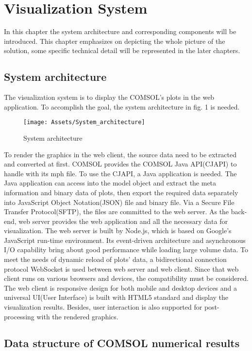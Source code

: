 \chapter{Visualization System}
In this chapter the system architecture and corresponding components will be introduced. This chapter emphasizes on depicting the whole picture of the solution, some specific technical detail will be represented in the later chapters.

\section{System architecture}

The visualization system is to display the COMSOL's plots in the web application. To accomplish the goal, the system architecture in fig. 1 is needed.

\begin{figure}[htb]
  \centering
  \texttt{[image: Assets/System\_architecture]}
  \caption{System architecture}
\end{figure}

To render the graphics in the web client, the source data need to be extracted and converted at first. COMSOL provides the COMSOL Java API(CJAPI) to handle with its mph file. To use the CJAPI, a Java application is needed. The Java application can access into the model object and extract the meta information and binary data of plots, then export the required data separately into JavaScript Object Notation(JSON) file and binary file. Via a Secure File Transfer Protocol(SFTP), the files are committed to the web server. As the back-end, web server provides the web application and all the necessary data for visualization. The web server is built by Node.js, which is based on Google's JavaScript run-time environment. Its event-driven architecture and asynchronous I/O capability bring about good performance while loading large volume data. To meet the needs of dynamic reload of plots' data, a bidirectional connection protocol WebSocket is used between web server and web client. Since that web client runs on various browsers and devices, the compatibility must be considered. The web client is responsive design for both mobile and desktop devices and a universal UI(User Interface) is built with HTML5 standard and display the visualization results. Besides, user interaction is also supported for post-processing with the rendered graphics.

\section{Data structure of COMSOL numerical results}

 